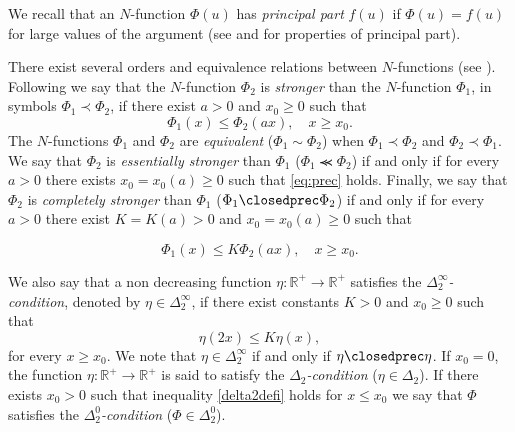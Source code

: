 \documentclass[twoside]{article}
\theoremstyle{remark}
\renewcommand{\leq}{\leqslant}
\renewcommand{\geq}{\geqslant}
\begin{document}
 We recall that an $N$-function $\Phi(u)$ has \emph{principal part} $f(u)$ if $\Phi(u)=f(u)$ for large values of the argument (see \cite[p. 16]{KR} and \cite[Sec. 7]{KR} for  properties of principal part).

There exist several orders and equivalence relations between $N$-functions (see \cite[Sec. 2.2]{rao1991theory}).
Following \cite[Def. 1, pp. 15-16]{rao1991theory} we say that the   $N$-function $\Phi_2$ is \emph{stronger} than the $N$-function  $\Phi_1$, in symbols  $\Phi_1\prec\Phi_2$, if  there exist $a>0$ and $x_0\geq 0$ such that
\begin{equation}\label{eq:prec}\Phi_1(x)\leq \Phi_2(ax), \quad x\geq x_0.\end{equation}
 The $N$-functions  $\Phi_1$ and   $\Phi_2$ are \emph{equivalent} ($\Phi_1\sim\Phi_2$)  when  $\Phi_1\prec\Phi_2$ and $\Phi_2\prec\Phi_1$.
We say that  $\Phi_2$ is \emph{essentially stronger} than  $\Phi_1$  ($\Phi_1\llcurly\Phi_2$) if and only if for every $a>0$ there exists $x_0=x_0(a)\geq 0$ such that \eqref{eq:prec} holds. Finally, we say that  $\Phi_2$ is \emph{completely stronger} than  $\Phi_1$  ($\Phi_1\closedprec\Phi_2$) if and only if for every $a>0$ there exist $K=K(a)>0$ and  $x_0=x_0(a)\geq 0$ such that


\begin{equation}\label{eq:prec2}\Phi_1(x)\leq K\Phi_2(ax), \quad x\geq x_0.\end{equation}


We also say that a non decreasing function $\eta:\mathbb{R}^+\rightarrow \mathbb{R}^+$ satisfies the  \emph{$\Delta_2^{\infty}$-condition}, denoted by $\eta \in \Delta_2^{\infty}$,
if there exist  constants $K>0$ and  $x_0\geq 0$ such that
\begin{equation}\label{delta2defi}\eta(2x)\leq K\eta(x),
\end{equation}
for every $x\geq x_0$. We note that $\eta \in \Delta_2^{\infty}$ if and only if $\eta\closedprec\eta$.
If $x_0=0$,  the function   $\eta:\mathbb{R}^+\rightarrow \mathbb{R}^+$ is said to satisfy the 
\emph{$\Delta_2$-condition} ($\eta \in \Delta_2$). 
If there exists $x_0>0$ such that  inequality \eqref{delta2defi} holds for $x\leq x_0$ we say that $\Phi$ satisfies the 
\emph{$\Delta_2^0$-condition} ($\Phi\in\Delta_2^0$).
\end{document}
